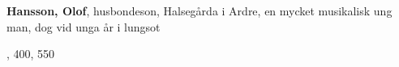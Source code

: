 \textbf{Hansson, Olof}, husbondeson, Halsegårda i Ardre, en mycket musikalisk ung man, dog vid unga år i lungsot

, 400, 550 
